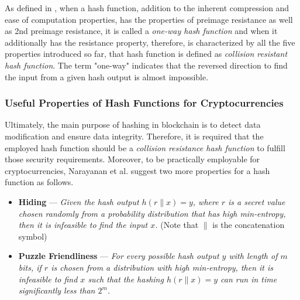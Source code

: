 As defined in \cite{menezes1997handbook}, when a hash function, addition to the inherent compression and ease of computation properties, has the properties of preimage resistance as well as 2nd preimage resistance, it is called a \textit{one-way hash function} and when it additionally has the resistance property, therefore, is characterized by all the five properties introduced so far, that hash function is defined as \textit{collision resistant hash function}. The term "one-way" indicates that the reversed direction to find the input from a given hash output is almost impossible.

\subsubsection{Useful Properties of Hash Functions for Cryptocurrencies}

Ultimately, the main purpose of hashing in blockchain is to detect data modification and ensure data integrity. Therefore, it is required that the employed hash function should be a \textit{collision resistance hash function} to fulfill those security requirements. Moreover, to be practically employable for cryptocurrencies, Narayanan et al. \cite{narayanan2016bitcoin} suggest two more properties for a hash function as follows.

\begin{itemize}
    \item \textbf{Hiding} --- \textit{Given the hash output $h(r \parallel x) = y$, where $r$ is a secret value chosen randomly from a probability distribution that has high min‐entropy, then it is infeasible to find the input $x$.} (Note that $\parallel$ is the concatenation symbol)
    \item \textbf{Puzzle Friendliness} --- \textit{For every possible hash output $y$ with length of $m$ bits, if $r$ is chosen from a distribution with high min‐entropy, then it is infeasible to find $x$ such that the hashing $h(r \parallel x) = y$ can run in time significantly less than $2^m$.}
\end{itemize}


